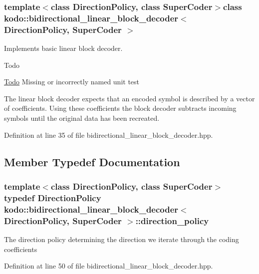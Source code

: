 \subsubsection*{template$<$class Direction\-Policy, class Super\-Coder$>$class kodo\-::bidirectional\-\_\-linear\-\_\-block\-\_\-decoder$<$ Direction\-Policy, Super\-Coder $>$}

Implements basic linear block decoder. 

\begin{DoxyRefDesc}{Todo}
\item[\hyperlink{todo__todo000003}{Todo}]Missing or incorrectly named unit test\end{DoxyRefDesc}
The linear block decoder expects that an encoded symbol is described by a vector of coefficients. Using these coefficients the block decoder subtracts incoming symbols until the original data has been recreated. 

Definition at line 35 of file bidirectional\-\_\-linear\-\_\-block\-\_\-decoder.\-hpp.



\subsection{Member Typedef Documentation}
\hypertarget{classkodo_1_1bidirectional__linear__block__decoder_aeb3af9a0a38bc5128d31d4e4a33be63f}{
\subsubsection[{direction\-\_\-policy}]{\setlength{\rightskip}{0pt plus 5cm}template$<$class Direction\-Policy, class Super\-Coder$>$ typedef Direction\-Policy {\bf kodo\-::bidirectional\-\_\-linear\-\_\-block\-\_\-decoder}$<$ Direction\-Policy, Super\-Coder $>$\-::{\bf direction\-\_\-policy}}}\label{classkodo_1_1bidirectional__linear__block__decoder_aeb3af9a0a38bc5128d31d4e4a33be63f}
The direction policy determining the direction we iterate through the coding coefficients 

Definition at line 50 of file bidirectional\-\_\-linear\-\_\-block\-\_\-decoder.\-hpp.

